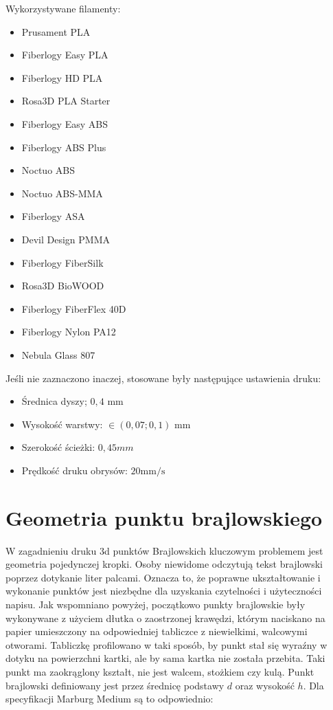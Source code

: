 \documentclass[12pt,a4paper]{article}
\begin{document}
Wykorzystywane filamenty:
\begin{itemize}
\item Prusament PLA
\item Fiberlogy Easy PLA
\item Fiberlogy HD PLA
\item Rosa3D PLA Starter
\item Fiberlogy Easy ABS
\item Fiberlogy ABS Plus
\item Noctuo ABS
\item Noctuo ABS-MMA
\item Fiberlogy ASA
\item Devil Design PMMA
\item Fiberlogy FiberSilk
\item Rosa3D BioWOOD
\item Fiberlogy FiberFlex 40D
\item Fiberlogy Nylon PA12
\item Nebula Glass 807
\end{itemize}

Jeśli nie zaznaczono inaczej, stosowane były następujące ustawienia druku:
\begin{itemize}
\item Średnica dyszy; $0{,}4\text{ mm}$
\item Wysokość warstwy: $\in (0{,}07; 0{,}1) \text{ mm}$
\item Szerokość ścieżki: $0{,}45 mm$
\item Prędkość druku obrysów: $20 \text{mm/s}$
\end{itemize}

\section{Geometria punktu brajlowskiego}
\label{sec:geometry}
W zagadnieniu druku 3d punktów Brajlowskich kluczowym problemem jest geometria pojedynczej kropki. Osoby niewidome odczytują tekst brajlowski poprzez dotykanie liter palcami. Oznacza to, że poprawne ukształtowanie i wykonanie punktów jest niezbędne dla uzyskania czytelności i użyteczności napisu.
Jak wspomniano powyżej, początkowo punkty brajlowskie były wykonywane z użyciem dłutka o zaostrzonej krawędzi, którym  naciskano na papier umieszczony na odpowiedniej tabliczce z niewielkimi, walcowymi otworami. Tabliczkę profilowano w taki sposób, by punkt stał się wyraźny w dotyku na powierzchni kartki, ale by sama kartka nie została przebita.
Taki punkt ma zaokrąglony kształt, nie jest walcem, stożkiem czy kulą.
Punkt brajlowski definiowany jest przez średnicę podstawy $d$ oraz wysokość $h$. Dla specyfikacji Marburg Medium \cite{brailleiso} są to odpowiednio:
\end{document}
